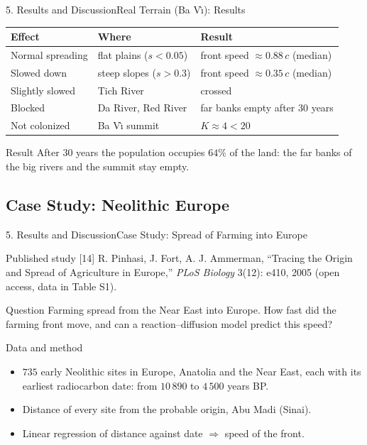 \documentclass[10pt]{beamer}
\begin{document}
    \begin{frame}{5. Results and Discussion}{Real Terrain (Ba V\`{\i}): Results}
      \begin{center}
        \small
        \renewcommand{\arraystretch}{1.3}
        \begin{tabular}{l l l}
          \hline
          \textbf{Effect} & \textbf{Where} & \textbf{Result} \\
          \hline
          Normal spreading & flat plains ($s < 0.05$) & front speed $\approx 0.88\,c$ (median) \\
          Slowed down & steep slopes ($s > 0.3$) & front speed $\approx 0.35\,c$ (median) \\
          Slightly slowed & Tich River & crossed \\
          Blocked & Da River, Red River & far banks empty after 30 years \\
          Not colonized & Ba V\`{\i} summit & $K \approx 4 < 20$ \\
          \hline
        \end{tabular}
      \end{center}
      \begin{block}{Result}
          After $30$ years the population occupies $64\%$ of the land: the far banks of the big rivers and the summit stay empty.
      \end{block}
    \end{frame}

  \subsection{Case Study: Neolithic Europe}
    \begin{frame}{5. Results and Discussion}{Case Study: Spread of Farming into Europe}
      \begin{block}{Published study \hfill [14]}
          R. Pinhasi, J. Fort, A. J. Ammerman, ``Tracing the Origin and Spread of Agriculture in Europe,'' \textit{PLoS Biology} 3(12): e410, 2005 (open access, data in Table S1).
      \end{block}
      \begin{block}{Question}
          Farming spread from the Near East into Europe. How fast did the farming front move, and can a reaction--diffusion model predict this speed?
      \end{block}
      \begin{block}{Data and method}
          \begin{itemize}
            \item $735$ early Neolithic sites in Europe, Anatolia and the Near East, each with its earliest radiocarbon date: from $10\,890$ to $4\,500$ years BP.
            \item Distance of every site from the probable origin, Abu Madi (Sinai).
            \item Linear regression of distance against date $\Rightarrow$ speed of the front.
          \end{itemize}
      \end{block}
    \end{frame}
\end{document}
